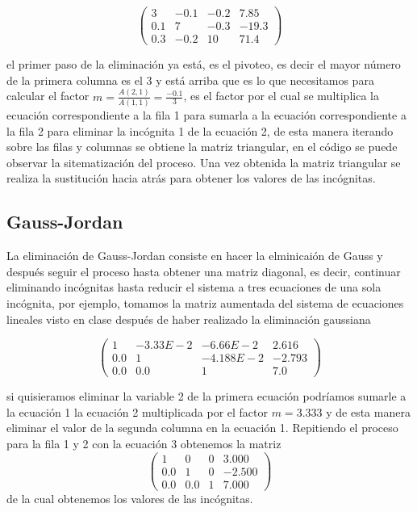 \documentclass[10pt,twocolumn]{article}
\begin{document}
\[ \left( \begin{array}{cccc}
3 & -0.1 & -0.2 & 7.85 \\
0.1 & 7 & -0.3 & -19.3 \\
0.3 & -0.2 & 10 & 71.4 \end{array} \right) \]

el primer paso de la eliminaci\'on ya est\'a, es el pivoteo, es decir el mayor n\'umero de la primera columna es el 3 y est\'a 
arriba que es lo que necesitamos para calcular el factor $ m=\frac{A(2,1)}{A(1,1)}= \frac{-0.1}{3} $, es el factor por el cual 
se multiplica la ecuaci\'on correspondiente a la fila 1 para sumarla a la ecuaci\'on correspondiente a la fila 2 para eliminar 
la inc\'ognita 1 de la ecuaci\'on 2, de esta manera 
iterando sobre las filas y columnas se obtiene la matriz triangular, en el c\'odigo se puede observar la sitematizaci\'on del 
proceso. Una vez obtenida la matriz triangular se realiza la sustituci\'on hacia atr\'as para obtener los valores de las 
inc\'ognitas. 
\subsection{Gauss-Jordan}
La eliminaci\'on de Gauss-Jordan consiste en hacer la elminicai\'on de Gauss y despu\'es seguir el proceso hasta obtener una 
matriz diagonal, es decir, continuar eliminando inc\'ognitas hasta reducir el sistema a tres ecuaciones de una sola inc\'ognita, 
por ejemplo, tomamos la matriz aumentada del sistema de ecuaciones lineales visto en clase despu\'es de haber realizado la 
eliminaci\'on gaussiana

\[ \left( \begin{array}{cccc}
1 & -3.33E-2 & -6.66E-2 & 2.616 \\
0.0 & 1 & -4.188E-2 & -2.793 \\
0.0 & 0.0 & 1 & 7.0 \end{array} \right) \]

si quisieramos eliminar la variable 2 de la primera ecuaci\'on podr\'iamos sumarle a la ecuaci\'on 1 la ecuaci\'on 2 
multiplicada por el factor $m=3.333$ y de esta manera eliminar el valor de la segunda columna en la ecuaci\'on 1. Repitiendo el 
proceso para la fila 1 y 2 con la ecuaci\'on 3 obtenemos la matriz 
\[ \left( \begin{array}{cccc}
1 & 0 & 0 & 3.000 \\
0.0 & 1 & 0 & -2.500 \\
0.0 & 0.0 & 1 & 7.000 \end{array} \right) \]
de la cual obtenemos los valores de las inc\'ognitas.
\end{document}
